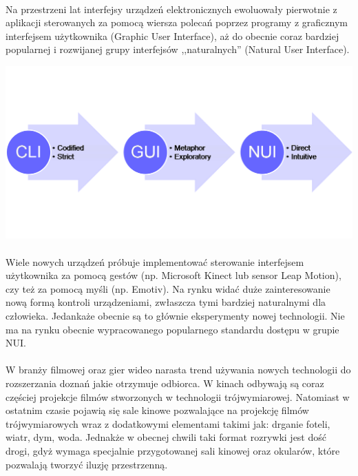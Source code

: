 \paragraph{}
Na przestrzeni lat interfejsy urządzeń elektronicznych ewoluowały pierwotnie z aplikacji sterowanych za pomocą wiersza polecań poprzez programy z graficznym interfejsem użytkownika (Graphic User Interface), aż do obecnie coraz bardziej popularnej i rozwijanej grupy interfejsów ,,naturalnych'' (Natural User Interface).
\begin{center}
\includegraphics[width=1\textwidth]{images/nui.png}
\end{center}
\paragraph{}
Wiele nowych urządzeń próbuje implementować sterowanie interfejsem użytkownika za pomocą gestów (np. Microsoft Kinect\cite{kinect} lub sensor Leap Motion\cite{leap}), czy też za pomocą myśli (np. Emotiv\cite{emotiv}). Na rynku widać duże zainteresowanie nową formą kontroli urządzeniami, zwłaszcza tymi bardziej naturalnymi dla człowieka. Jedankaże obecnie są to głównie eksperymenty nowej technologii. Nie ma na rynku obecnie wypracowanego popularnego standardu dostępu w grupie NUI.

\paragraph{}
W branży filmowej oraz gier wideo narasta trend używania nowych technologii do rozszerzania doznań jakie otrzymuje odbiorca.
W kinach odbywają są coraz częściej projekcje filmów stworzonych w technologii trójwymiarowej. Natomiast w ostatnim czasie pojawią się sale kinowe pozwalające na projekcję filmów trójwymiarowych wraz z dodatkowymi elementami takimi jak: drganie foteli, wiatr, dym, woda\cite{cinema}. Jednakże w obecnej chwili taki format rozrywki jest dość drogi, gdyż wymaga specjalnie przygotowanej sali kinowej oraz okularów, które pozwalają tworzyć iluzję przestrzenną. 

